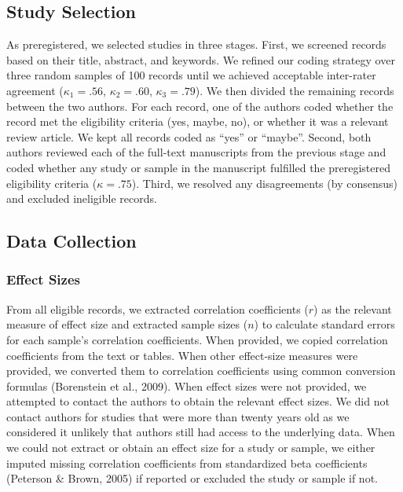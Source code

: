 \documentclass[twocolumn, 11pt, letterpaper]{article}
\begin{document}
\hypertarget{study-selection}{%
\subsection{Study Selection}\label{study-selection}}

As preregistered, we selected studies in three stages. First, we
screened records based on their title, abstract, and keywords. We
refined our coding strategy over three random samples of 100 records
until we achieved acceptable inter-rater agreement (\(\kappa_1 = .56\),
\(\kappa_2 = .60\), \(\kappa_3 = .79\)). We then divided the remaining
records between the two authors. For each record, one of the authors
coded whether the record met the eligibility criteria (yes, maybe, no),
or whether it was a relevant review article. We kept all records coded
as ``yes'' or ``maybe''. Second, both authors reviewed each of the
full-text manuscripts from the previous stage and coded whether any
study or sample in the manuscript fulfilled the preregistered
eligibility criteria (\(\kappa = .75\)). Third, we resolved any
disagreements (by consensus) and excluded ineligible records.

\hypertarget{data-collection}{%
\subsection{Data Collection}\label{data-collection}}

\hypertarget{effect-sizes}{%
\subsubsection{Effect Sizes}\label{effect-sizes}}

From all eligible records, we extracted correlation coefficients (\(r\))
as the relevant measure of effect size and extracted sample sizes
(\(n\)) to calculate standard errors for each sample's correlation
coefficients. When provided, we copied correlation coefficients from the
text or tables. When other effect-size measures were provided, we
converted them to correlation coefficients using common conversion
formulas (Borenstein et al., 2009). When effect sizes were not provided,
we attempted to contact the authors to obtain the relevant effect sizes.
We did not contact authors for studies that were more than twenty years
old as we considered it unlikely that authors still had access to the
underlying data. When we could not extract or obtain an effect size for
a study or sample, we either imputed missing correlation coefficients
from standardized beta coefficients (Peterson \& Brown, 2005) if
reported or excluded the study or sample if not.
\end{document}

